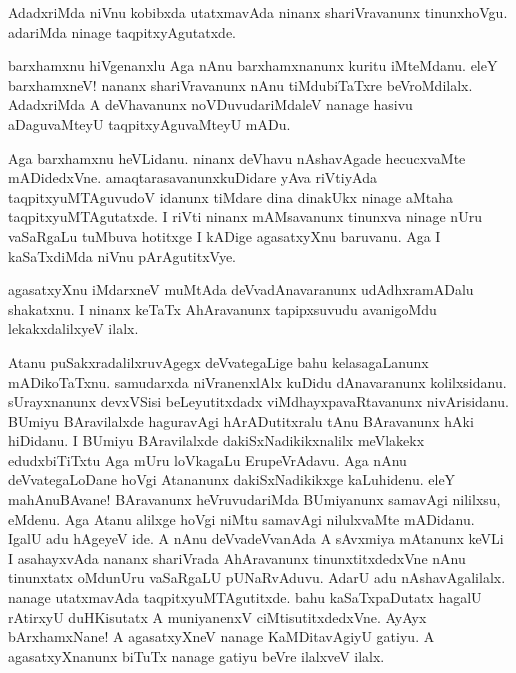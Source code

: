 \begin{mng}
AdadxriMda niVnu kobibxda utatxmavAda ninanx shariVravanunx tinunxhoVgu. adariMda ninage taqpitxyAgutatxde.
\end{mng}

\begin{mng}
barxhamxnu hiVgenanxlu Aga nAnu barxhamxnanunx kuritu iMteMdanu. eleY barxhamxneV! nananx shariVravanunx nAnu tiMdubiTaTxre beVroMdilalx. AdadxriMda A deVhavanunx noVDuvudariMdaleV nanage hasivu aDaguvaMteyU taqpitxyAguvaMteyU mADu.
\end{mng}

\begin{mng}
Aga barxhamxnu heVLidanu. ninanx deVhavu nAshavAgade hecucxvaMte mADidedxVne. amaqtarasavanunxkuDidare yAva riVtiyAda taqpitxyuMTAguvudoV idanunx tiMdare dina dinakUkx ninage aMtaha taqpitxyuMTAgutatxde. I riVti ninanx mAMsavanunx tinunxva ninage nUru vaSaRgaLu tuMbuva hotitxge I kADige agasatxyXnu baruvanu. Aga I kaSaTxdiMda niVnu pArAgutitxVye.
\end{mng}

\begin{mng}
agasatxyXnu iMdarxneV muMtAda deVvadAnavaranunx udAdhxramADalu shakatxnu. I ninanx keTaTx AhAravanunx tapipxsuvudu avanigoMdu lekakxdalilxyeV ilalx.
\end{mng}

\begin{mng}
Atanu puSakxradalilxruvAgegx deVvategaLige bahu kelasagaLanunx mADikoTaTxnu. samudarxda niVranenxlAlx kuDidu dAnavaranunx kolilxsidanu. sUrayxnanunx devxVSisi beLeyutitxdadx viMdhayxpavaRtavanunx nivArisidanu. BUmiyu BAravilalxde haguravAgi hArADutitxralu tAnu BAravanunx hAki hiDidanu. I BUmiyu BAravilalxde dakiSxNadikikxnalilx meVlakekx edudxbiTiTxtu Aga mUru loVkagaLu ErupeVrAdavu. Aga nAnu deVvategaLoDane hoVgi Atananunx dakiSxNadikikxge kaLuhidenu. eleY mahAnuBAvane! BAravanunx heVruvudariMda BUmiyanunx samavAgi nililxsu, eMdenu. Aga Atanu alilxge hoVgi niMtu samavAgi nilulxvaMte mADidanu. IgalU adu hAgeyeV ide. A nAnu deVvadeVvanAda A sAvxmiya mAtanunx keVLi I asahayxvAda nananx shariVrada AhAravanunx tinunxtitxdedxVne nAnu tinunxtatx oMdunUru vaSaRgaLU pUNaRvAduvu. AdarU adu nAshavAgalilalx. nanage utatxmavAda taqpitxyuMTAgutitxde. bahu kaSaTxpaDutatx hagalU rAtirxyU duHKisutatx A muniyanenxV ciMtisutitxdedxVne. AyAyx bArxhamxNane! A agasatxyXneV nanage KaMDitavAgiyU gatiyu. A agasatxyXnanunx biTuTx nanage gatiyu beVre ilalxveV ilalx.
\end{mng}

